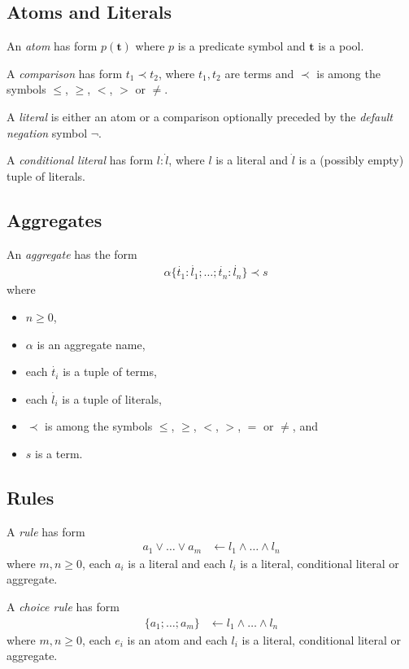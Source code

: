 \documentclass{article}
\newcommand{\pool}[1]{\boldsymbol{#1}}
\newcommand{\tuple}[1]{\dot{#1}}
\begin{document}
	\subsection{Atoms and Literals}

	An \emph{atom} has form $p(\pool{t})$ where $p$ is a predicate symbol and $\pool{t}$ is a pool.

	A \emph{comparison} has form $t_1 \prec t_2$, where $t_1,t_2$ are terms and $\prec$ is among the symbols $\leq$, $\ge$, $<$, $>$ or $\neq$.

	A \emph{literal} is either an atom or a comparison optionally preceded by the \emph{default negation} symbol $\neg$.

	A \emph{conditional literal} has form $l : \tuple{l}$, where $l$ is a literal and $\tuple{l}$ is a (possibly empty) tuple of literals.

	\subsection{Aggregates}
	An \emph{aggregate} has the form
	\begin{align}
		&\alpha\{\tuple{t_1} : \tuple{l_1}; \dots; \tuple{t_n} : \tuple{l_n}\} \prec s \label{aggregate}
	\end{align}
	where
	\begin{itemize}
		\item $n \geq 0$,
		\item $\alpha$ is an aggregate name,
		\item each $\tuple{t_i}$ is a tuple of terms,
		\item each $\tuple{l_i}$ is a tuple of literals,
		\item $\prec$ is among the symbols $\leq$, $\ge$, $<$, $>$, $=$ or $\neq$, and
		\item $s$ is a term.
	\end{itemize}

	\subsection{Rules}

	A \emph{rule} has form
	\begin{align}
		a_1 \vee \dots \vee a_m &\leftarrow l_1 \wedge \dots \wedge l_n \label{rule}
	\end{align}
	where $m, n \ge 0$, each $a_i$ is a literal and each $l_i$ is a literal, conditional literal or aggregate.

	A \emph{choice rule} has form
	\begin{align}
		\{a_1; \dots; a_m\} &\leftarrow l_1 \wedge \dots \wedge l_n \label{choice}
	\end{align}
	where
	$m, n \geq 0$,
	each $e_i$ is an atom and
	each $l_i$ is a literal, conditional literal or aggregate.
\end{document}
